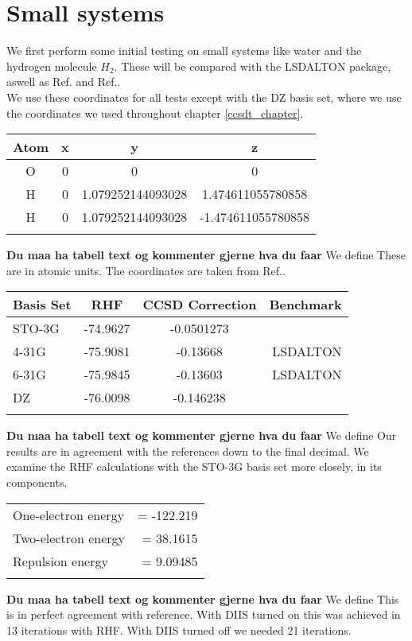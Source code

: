 \section{Small systems}
We first perform some initial testing on small systems like water and
the hydrogen molecule $H_2$. These will be compared with the LSDALTON
package, aswell as Ref.\cite{ccsd_benchmark_url_stuff} and
Ref.\cite{CCSDT-ref1}. \\

We use these coordinates for all tests except with the DZ basis set, where we use the coordinates we used throughout chapter \ref{ccsdt_chapter}.  
\begin{center}
  \begin{tabular}{ c c c c }
  \hline
     Atom & x & y & z \\ \hline
     O & 0 & 0 & 0 \\
     H & 0 & 1.079252144093028 & 1.474611055780858 \\
     H & 0 & 1.079252144093028 & -1.474611055780858 \\
     \hline \\
  \end{tabular} 
\end{center} 
{\bf Du maa ha tabell text og kommenter gjerne hva du faar} We define
These are in atomic units. The coordinates are taken from Ref.\cite{ccsd_benchmark_url_stuff}.
\begin{center}
\begin{tabular}{ l c c r }
	\hline
  	Basis Set & RHF & CCSD Correction & Benchmark \\ \hline
  	STO-3G & -74.9627 & -0.0501273 & \cite{ccsd_benchmark_url_stuff} \\ 
  	4-31G & -75.9081 & -0.13668 & LSDALTON \\ 
  	6-31G & -75.9845 & -0.13603 & LSDALTON \\ 
  	DZ & -76.0098 & -0.146238 & \cite{CCSDT-ref1} \\ \hline
  	\\
	\end{tabular}
\end{center}
{\bf Du maa ha tabell text og kommenter gjerne hva du faar} We define
Our results are in agreement with the references down to the final
decimal. We examine the RHF calculations with the STO-3G basis set
more closely, in its components.  \\

\begin{center}
\begin{tabular}{ l r }
  	One-electron energy & = -122.219 \\ 
  	Two-electron energy & = 38.1615 \\
  	Repulsion energy & = 9.09485 \\
  	\\
	\end{tabular}
\end{center}
{\bf Du maa ha tabell text og kommenter gjerne hva du faar} We define
This is in perfect agreement with reference. With DIIS turned on this
was achieved in 13 iterations with RHF. With DIIS turned off we needed
21 iterations.

